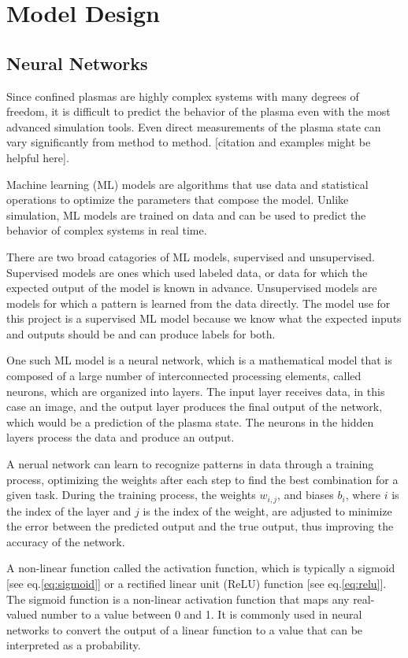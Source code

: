 %
\chapter{Model Design}
\label{sec:code:model}

\section{Neural Networks}
Since confined plasmas are highly complex systems with many degrees of freedom, it is difficult to predict the behavior of the plasma even with the most advanced simulation tools. Even direct measurements of the plasma state can vary significantly from method to method. [citation and examples might be helpful here].

Machine learning (ML) models are algorithms that use data and statistical operations to optimize the parameters that compose the model. Unlike simulation, ML models are trained on data and can be used to predict the behavior of complex systems in real time.

There are two broad catagories of ML models, supervised and unsupervised. Supervised models are ones which used labeled data, or data for which the expected output of the model is known in advance. Unsupervised models are models for which a pattern is learned from the data directly. The model use for this project is a supervised ML model because we know what the expected inputs and outputs should be and can produce labels for both.

One such ML model is a neural network, which is a mathematical model that is composed of a large number of interconnected processing elements, called neurons, which are organized into layers. The input layer receives data, in this case an image, and the output layer produces the final output of the network, which would be a prediction of the plasma state. The neurons in the hidden layers process the data and produce an output.

A nerual network can learn to recognize patterns in data through a training process, optimizing the weights after each step to find the best combination for a given task. During the training process, the weights $w_{i,j}$, and biases $b_i$, where $i$ is the index of the layer and $j$ is the index of the weight, are adjusted to minimize the error between the predicted output and the true output, thus improving the accuracy of the network.

A non-linear function called the activation function, which is typically a sigmoid [see eq.\ref{eq:sigmoid}] or a rectified linear unit (ReLU) function [see eq.\ref{eq:relu}]. The sigmoid function is a non-linear activation function that maps any real-valued number to a value between 0 and 1. It is commonly used in neural networks to convert the output of a linear function to a value that can be interpreted as a probability.

